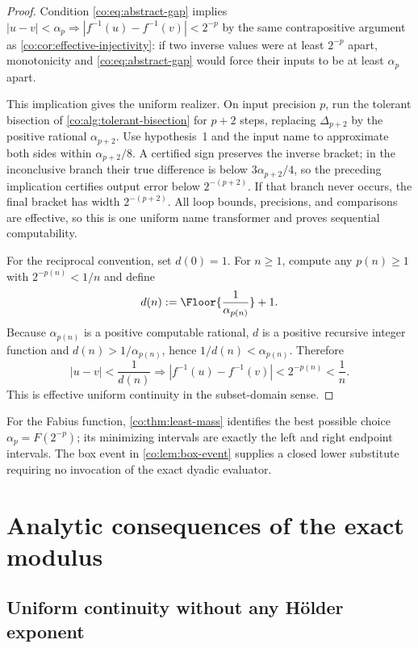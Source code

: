 \begin{proof}
Condition \eqref{co:eq:abstract-gap} implies
$|u-v|<\alpha_p\Rightarrow|f^{-1}(u)-f^{-1}(v)|<2^{-p}$ by the same
contrapositive argument as \cref{co:cor:effective-injectivity}: if two inverse
values were at least $2^{-p}$ apart, monotonicity and
\eqref{co:eq:abstract-gap} would force their inputs to be at least
$\alpha_p$ apart.

This implication gives the uniform realizer.  On input precision $p$, run the
tolerant bisection of \cref{co:alg:tolerant-bisection} for $p+2$ steps, replacing
$\Delta_{p+2}$ by the positive rational $\alpha_{p+2}$.  Use hypothesis~1 and
the input name to approximate both sides within $\alpha_{p+2}/8$.  A certified
sign preserves the inverse bracket; in the inconclusive branch their true
difference is below $3\alpha_{p+2}/4$, so the preceding implication certifies
output error below $2^{-(p+2)}$.  If that branch never occurs, the final
bracket has width $2^{-(p+2)}$.  All loop bounds, precisions, and comparisons
are effective, so this is one uniform name transformer and proves sequential
computability.

For the reciprocal convention, set $d(0)=1$.  For $n\ge1$, compute any
$p(n)\ge1$ with $2^{-p(n)}<1/n$ and define
\[
 d(n):=\Floor{\frac1{\alpha_{p(n)}}}+1.
\]
Because $\alpha_{p(n)}$ is a positive computable rational, $d$ is a positive
recursive integer function and $d(n)>1/\alpha_{p(n)}$, hence
$1/d(n)<\alpha_{p(n)}$.  Therefore
\[
 |u-v|<\frac1{d(n)}
 \Longrightarrow |f^{-1}(u)-f^{-1}(v)|<2^{-p(n)}<\frac1n.
\]
This is effective uniform continuity in the subset-domain sense.
\end{proof}

For the Fabius function, \cref{co:thm:least-mass} identifies the best possible
choice $\alpha_p=F(2^{-p})$; its minimizing intervals are exactly the left and
right endpoint intervals.  The box event in \cref{co:lem:box-event} supplies a
closed lower substitute requiring no invocation of the exact dyadic evaluator.

\section{Analytic consequences of the exact modulus}

\subsection{Uniform continuity without any H\"older exponent}

